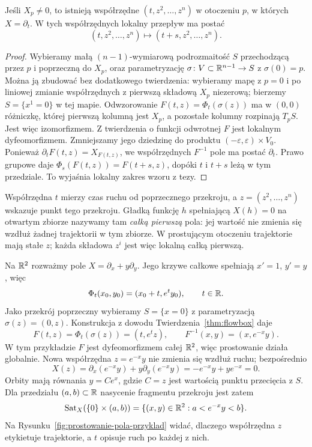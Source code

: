 \begin{twierdzenie}\label{thm:flowbox}
Jeśli $X_p\ne0$, to istnieją współrzędne $(t,z^2,\ldots,z^n)$
w otoczeniu $p$, w których $X=\partial_t$. W tych współrzędnych
lokalny przepływ ma postać
\[
 (t,z^2,\ldots,z^n)\longmapsto(t+s,z^2,\ldots,z^n).
\]
\end{twierdzenie}
\begin{proof}
Wybieramy małą $(n-1)$-wymiarową podrozmaitość $S$
przechodzącą przez $p$ i poprzeczną do $X_p$, oraz parametryzację
$\sigma\colon V\subset\mathbb{R}^{n-1}\to S$ z $\sigma(0)=p$.
Można ją zbudować bez dodatkowego twierdzenia: wybieramy mapę
z $p=0$ i po liniowej zmianie współrzędnych z pierwszą składową
$X_p$ niezerową; bierzemy $S=\{x^1=0\}$ w tej mapie.
Odwzorowanie $F(t,z)=\Phi_t(\sigma(z))$ ma w $(0,0)$
różniczkę, której pierwszą kolumną jest $X_p$, a pozostałe kolumny
rozpinają $T_pS$. Jest więc izomorfizmem. Z twierdzenia o funkcji
odwrotnej $F$ jest lokalnym dyfeomorfizmem. Zmniejszamy jego
dziedzinę do produktu $(-\varepsilon,\varepsilon)\times V_0$.
Ponieważ $\partial_tF(t,z)=X_{F(t,z)}$, we współrzędnych $F^{-1}$
pole ma postać $\partial_t$. Prawo grupowe daje
$\Phi_s(F(t,z))=F(t+s,z)$, dopóki $t$ i $t+s$ leżą
w tym przedziale. To wyjaśnia lokalny zakres wzoru z tezy.
\end{proof}

Współrzędna $t$ mierzy czas ruchu od poprzecznego przekroju,
a $z=(z^2,\ldots,z^n)$ wskazuje punkt tego przekroju.
Gładką funkcję $h$ spełniającą $X(h)=0$ na otwartym zbiorze
nazywamy tam \emph{całką pierwszą} pola: jej wartość nie zmienia się
wzdłuż żadnej trajektorii w tym zbiorze.
W prostującym otoczeniu trajektorie mają stałe $z$;
każda składowa $z^i$ jest więc lokalną całką pierwszą.

\begin{przyklad}
Na $\mathbb{R}^2$ rozważmy pole
$X=\partial_x+y\partial_y$.
Jego krzywe całkowe spełniają $x'=1$, $y'=y$, więc
\[
\Phi_t(x_0,y_0)=(x_0+t,e^t y_0),
\qquad t\in\mathbb{R}.
\]
Jako przekrój poprzeczny wybieramy $S=\{x=0\}$ z
parametryzacją $\sigma(z)=(0,z)$.
Konstrukcja z dowodu Twierdzenia~\ref{thm:flowbox} daje
\[
F(t,z)=\Phi_t(\sigma(z))=(t,e^t z),
\qquad F^{-1}(x,y)=(x,e^{-x}y).
\]
W tym przykładzie $F$ jest dyfeomorfizmem całej $\mathbb{R}^2$,
więc prostowanie działa globalnie. Nowa współrzędna
$z=e^{-x}y$ nie zmienia się wzdłuż ruchu; bezpośrednio
\[
X(z)=\partial_x(e^{-x}y)+y\partial_y(e^{-x}y)
=-e^{-x}y+ye^{-x}=0.
\]
Orbity mają równania $y=Ce^x$, gdzie $C=z$ jest wartością
punktu przecięcia z $S$. Dla przedziału $(a,b)\subset\mathbb{R}$
nasycenie fragmentu przekroju jest zatem
\[
\operatorname{Sat}_X(\{0\}\times(a,b))
=\{(x,y)\in\mathbb{R}^2:a<e^{-x}y<b\}.
\]
Na Rysunku~\ref{fig:prostowanie-pola-przyklad} widać,
dlaczego współrzędna $z$ etykietuje trajektorie, a $t$
opisuje ruch po każdej z nich.
\end{przyklad}

